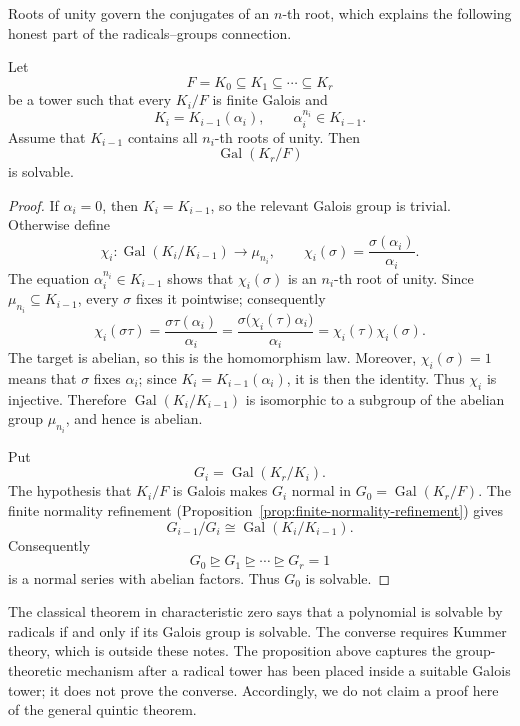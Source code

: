 Roots of unity govern the conjugates of an \(n\)-th root, which explains the
following honest part of the radicals--groups connection.

\begin{proposition}\label{prop:radical-solvable}
Let
\[
F=K_0\subseteq K_1\subseteq\cdots\subseteq K_r
\]
be a tower such that every \(K_i/F\) is finite Galois and
\[
K_i=K_{i-1}(\alpha_i),
\qquad
\alpha_i^{n_i}\in K_{i-1}.
\]
Assume that \(K_{i-1}\) contains all \(n_i\)-th roots of unity.  Then
\[
\operatorname{Gal}(K_r/F)
\]
is solvable.
\end{proposition}
\begin{proof}
If \(\alpha_i=0\), then \(K_i=K_{i-1}\), so the relevant Galois group is
trivial.  Otherwise define
\[
\chi_i:\operatorname{Gal}(K_i/K_{i-1})\longrightarrow\mu_{n_i},
\qquad
\chi_i(\sigma)=\frac{\sigma(\alpha_i)}{\alpha_i}.
\]
The equation \(\alpha_i^{n_i}\in K_{i-1}\) shows that \(\chi_i(\sigma)\)
is an \(n_i\)-th root of unity.  Since \(\mu_{n_i}\subseteq K_{i-1}\), every
\(\sigma\) fixes it pointwise; consequently
\[
\chi_i(\sigma\tau)
=\frac{\sigma\tau(\alpha_i)}{\alpha_i}
=\frac{\sigma\bigl(\chi_i(\tau)\alpha_i\bigr)}{\alpha_i}
=\chi_i(\tau)\chi_i(\sigma).
\]
The target is abelian, so this is the homomorphism law.  Moreover,
\(\chi_i(\sigma)=1\) means that \(\sigma\) fixes \(\alpha_i\); since
\(K_i=K_{i-1}(\alpha_i)\), it is then the identity.  Thus \(\chi_i\) is
injective.  Therefore \(\operatorname{Gal}(K_i/K_{i-1})\) is isomorphic to
a subgroup of the abelian group \(\mu_{n_i}\), and hence is abelian.

Put
\[
G_i=\operatorname{Gal}(K_r/K_i).
\]
The hypothesis that \(K_i/F\) is Galois makes \(G_i\) normal in
\(G_0=\operatorname{Gal}(K_r/F)\).  The finite normality refinement
(Proposition~\ref{prop:finite-normality-refinement}) gives
\[
G_{i-1}/G_i\cong\operatorname{Gal}(K_i/K_{i-1}).
\]
Consequently
\[
G_0\trianglerighteq G_1\trianglerighteq\cdots\trianglerighteq G_r=1
\]
is a normal series with abelian factors.  Thus \(G_0\) is solvable.
\end{proof}

\begin{remark}
The classical theorem in characteristic zero says that a polynomial is
solvable by radicals if and only if its Galois group is solvable.  The converse
requires Kummer theory, which is outside these notes.  The proposition above
captures the group-theoretic mechanism after a radical tower has been placed
inside a suitable Galois tower; it does not prove the converse.  Accordingly,
we do not claim a proof here of the general quintic theorem.
\end{remark}

